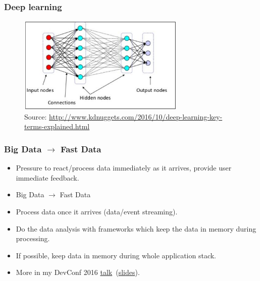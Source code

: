 \documentclass[10pt,utf8]{beamer}
\begin{document}
\begin{frame}
	\frametitle{Deep learning}
	 {
		\begin{figure}
			\centering
			\includegraphics[width=8cm]{./img/neural-networks-layers.eps}
			\caption{\tiny{Source: \url{http://www.kdnuggets.com/2016/10/deep-learning-key-terms-explained.html}}}
		\end{figure}
	}
\end{frame}

\begin{frame}
	\frametitle{Big Data $\rightarrow$ Fast Data}
	\begin{itemize}
		\item Pressure to react/process data immediately as it arrives, provide user immediate feedback.
		\pause
		\item Big Data $\rightarrow$ Fast Data
	\end{itemize}

	\vspace{1cm}
	
	 {
		\begin{itemize}
			\pause
			\item Process data once it arrives (data/event streaming).
			\pause
			\item Do the data analysis with frameworks which keep the data in memory during processing.
			\pause
			\item If possible, keep data in memory during whole application stack.
			\pause
			\item More in my DevConf 2016 \color{blue}\href{https://www.youtube.com/watch?v=98zYYs7c2wc}{talk}\color{black}~(\color{blue}\href{https://github.com/vjuranek/presentations/blob/master/DevConf_Brno2016/devconf2016.pdf}{slides}\color{black}).
		\end{itemize}
	}
\end{frame}
\end{document}
